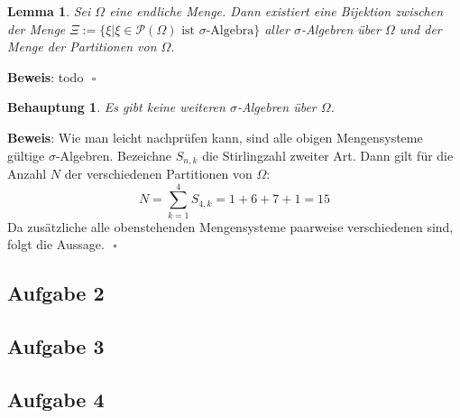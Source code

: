\documentclass[11pt,a4paper,ngerman]{article}
\newcommand{\set}[1]{ \{ #1 \}}
\newtheorem{prop}{\bfseries Behauptung}
\newtheorem{lemma}{\bfseries Lemma}
\begin{document}
\begin{lemma}
Sei $\Omega$ eine endliche Menge. Dann existiert eine Bijektion zwischen der Menge $\Xi := \set{\xi | \xi \in \mathcal{P}(\Omega) \text{ ist $\sigma$-Algebra}}$ aller $\sigma$-Algebren über $\Omega$ und der Menge der Partitionen von $\Omega$.	
\end{lemma}

\textbf{Beweis}: todo $\mbox{}$ \hfill $\square$

\begin{prop}
 Es gibt keine weiteren $\sigma$-Algebren über $\Omega$. 
\end{prop}
\textbf{Beweis}: Wie man leicht nachprüfen kann, sind alle obigen Mengensysteme gültige $\sigma$-Algebren. Bezeichne $S_{n,k}$ die Stirlingzahl zweiter Art.
Dann gilt für die Anzahl $N$ der verschiedenen Partitionen von $\Omega$: 
\begin{equation}
N = \sum_{k=1}^4 S_{4,k} = 1 +6+ 7+ 1=15
\end{equation}
Da zusätzliche alle obenstehenden Mengensysteme paarweise verschiedenen sind, folgt die Aussage.
$\mbox{}$ \hfill $\square$

\subsection*{Aufgabe 2}
\subsection*{Aufgabe 3}
\subsection*{Aufgabe 4}


\label{LastPage}
\end{document}
